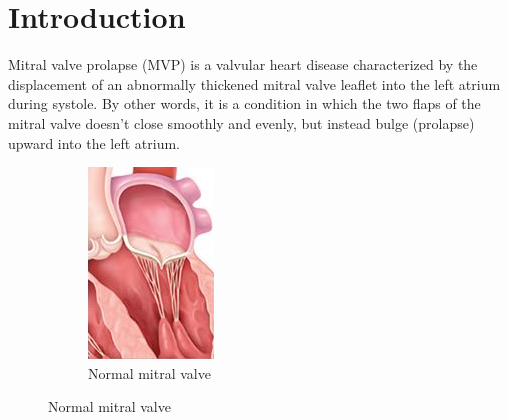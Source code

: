 \chapter*{Introduction}
Mitral valve prolapse (MVP) is a valvular heart disease characterized by the
displacement of an abnormally thickened mitral valve leaflet into the left
atrium during systole. By other words, it is a condition in which the two flaps
of the mitral valve doesn't close smoothly and evenly, but instead bulge
(prolapse) upward into the left atrium.\cite{Hayek2005}
\begin{figure}[H]
  \centering
  \begin{subfigure}[b]{0.3\textwidth}
    \includegraphics[width=\textwidth]{./fig/normalMT.png}
      \caption{Normal mitral valve}

\end{subfigure}
\end{figure}
